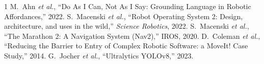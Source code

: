 \documentclass[conference]{IEEEtran}
\begin{document}
\begin{thebibliography}{1}
 M.~Ahn \emph{et al.}, ``Do As I Can, Not As I Say: Grounding
Language in Robotic Affordances,'' 2022.
 S.~Macenski \emph{et al.}, ``Robot Operating System 2: Design,
architecture, and uses in the wild,'' \emph{Science Robotics}, 2022.
 S.~Macenski \emph{et al.}, ``The Marathon 2: A Navigation System
(Nav2),'' IROS, 2020.
 D.~Coleman \emph{et al.}, ``Reducing the Barrier to Entry of
Complex Robotic Software: a MoveIt! Case Study,'' 2014.
 G.~Jocher \emph{et al.}, ``Ultralytics YOLOv8,'' 2023.
\end{thebibliography}
\end{document}
